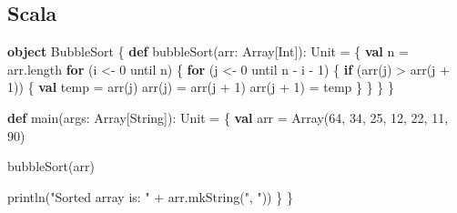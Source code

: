 \documentclass[
  letterpaper,
  DIV=11,
  numbers=noendperiod]{scrreprt}
\newenvironment{Shaded}{\begin{snugshade}}{\end{snugshade}}
\newcommand{\BuiltInTok}[1]{\textcolor[rgb]{0.00,0.23,0.31}{#1}}
\newcommand{\ControlFlowTok}[1]{\textcolor[rgb]{0.00,0.23,0.31}{\textbf{#1}}}
\newcommand{\DecValTok}[1]{\textcolor[rgb]{0.68,0.00,0.00}{#1}}
\newcommand{\ExtensionTok}[1]{\textcolor[rgb]{0.00,0.23,0.31}{#1}}
\newcommand{\FunctionTok}[1]{\textcolor[rgb]{0.28,0.35,0.67}{#1}}
\newcommand{\KeywordTok}[1]{\textcolor[rgb]{0.00,0.23,0.31}{\textbf{#1}}}
\newcommand{\NormalTok}[1]{\textcolor[rgb]{0.00,0.23,0.31}{#1}}
\newcommand{\OperatorTok}[1]{\textcolor[rgb]{0.37,0.37,0.37}{#1}}
\newcommand{\StringTok}[1]{\textcolor[rgb]{0.13,0.47,0.30}{#1}}
\begin{document}
\subsection{Scala}\label{scala}

\begin{Shaded}
\begin{Highlighting}[]
\KeywordTok{object}\NormalTok{ BubbleSort }\OperatorTok{\{}
  \KeywordTok{def} \FunctionTok{bubbleSort}\OperatorTok{(}\NormalTok{arr}\OperatorTok{:} \ExtensionTok{Array}\OperatorTok{[}\BuiltInTok{Int}\OperatorTok{]):} \BuiltInTok{Unit} \OperatorTok{=} \OperatorTok{\{}
    \KeywordTok{val}\NormalTok{ n }\OperatorTok{=}\NormalTok{ arr}\OperatorTok{.}\NormalTok{length}
    \ControlFlowTok{for} \OperatorTok{(}\NormalTok{i }\OperatorTok{\textless{}{-}} \DecValTok{0}\NormalTok{ until n}\OperatorTok{)} \OperatorTok{\{}
      \ControlFlowTok{for} \OperatorTok{(}\NormalTok{j }\OperatorTok{\textless{}{-}} \DecValTok{0}\NormalTok{ until n }\OperatorTok{{-}}\NormalTok{ i }\OperatorTok{{-}} \DecValTok{1}\OperatorTok{)} \OperatorTok{\{}
        \ControlFlowTok{if} \OperatorTok{(}\FunctionTok{arr}\OperatorTok{(}\NormalTok{j}\OperatorTok{)} \OperatorTok{\textgreater{}} \FunctionTok{arr}\OperatorTok{(}\NormalTok{j }\OperatorTok{+} \DecValTok{1}\OperatorTok{))} \OperatorTok{\{}
          \KeywordTok{val}\NormalTok{ temp }\OperatorTok{=} \FunctionTok{arr}\OperatorTok{(}\NormalTok{j}\OperatorTok{)}
          \FunctionTok{arr}\OperatorTok{(}\NormalTok{j}\OperatorTok{)} \OperatorTok{=} \FunctionTok{arr}\OperatorTok{(}\NormalTok{j }\OperatorTok{+} \DecValTok{1}\OperatorTok{)}
          \FunctionTok{arr}\OperatorTok{(}\NormalTok{j }\OperatorTok{+} \DecValTok{1}\OperatorTok{)} \OperatorTok{=}\NormalTok{ temp}
        \OperatorTok{\}}
      \OperatorTok{\}}
    \OperatorTok{\}}
  \OperatorTok{\}}

  \KeywordTok{def} \FunctionTok{main}\OperatorTok{(}\NormalTok{args}\OperatorTok{:} \ExtensionTok{Array}\OperatorTok{[}\ExtensionTok{String}\OperatorTok{]):} \BuiltInTok{Unit} \OperatorTok{=} \OperatorTok{\{}
    \KeywordTok{val}\NormalTok{ arr }\OperatorTok{=} \ExtensionTok{Array}\OperatorTok{(}\DecValTok{64}\OperatorTok{,} \DecValTok{34}\OperatorTok{,} \DecValTok{25}\OperatorTok{,} \DecValTok{12}\OperatorTok{,} \DecValTok{22}\OperatorTok{,} \DecValTok{11}\OperatorTok{,} \DecValTok{90}\OperatorTok{)}

    \FunctionTok{bubbleSort}\OperatorTok{(}\NormalTok{arr}\OperatorTok{)}

    \FunctionTok{println}\OperatorTok{(}\StringTok{"Sorted array is: "} \OperatorTok{+}\NormalTok{ arr}\OperatorTok{.}\FunctionTok{mkString}\OperatorTok{(}\StringTok{", "}\OperatorTok{))}
  \OperatorTok{\}}
\OperatorTok{\}}
\end{Highlighting}
\end{Shaded}
\end{document}
